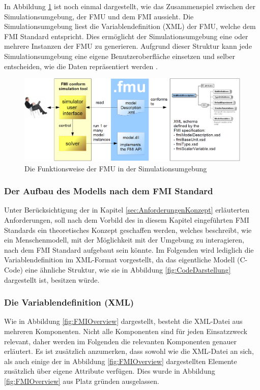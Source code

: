 \newline
In Abbildung \ref{fig:FMUEinordnung} ist noch einmal dargestellt, wie das Zusammenspiel zwischen der Simulationsumgebung, der FMU und dem FMI aussieht. Die Simulationsumgebung liest die Variablendefinition (XML) der FMU, welche dem FMI Standard entspricht. Dies ermöglicht der Simulationsumgebung eine oder mehrere Instanzen der FMU zu generieren. Aufgrund dieser Struktur kann jede Simulationsumgebung eine eigene Benutzeroberfläche einsetzen und selber entscheiden, wie die Daten repräsentiert werden \cite[S.7]{26}.
\begin{figure}[h]
	\centering
	\includegraphics[width=1\linewidth]{Bilder/A22_User-FMU-FMI}
	\caption{Die Funktionsweise der FMU in der Simulationsumgebung \cite[S.7]{26}}
	\label{fig:FMUEinordnung}
\end{figure}

\subsubsection{Der Aufbau des Modells nach dem FMI Standard}\label{sec:ModelAufbau}
Unter Berücksichtigung der in Kapitel \ref{sec:AnforderungenKonzept} erläuterten Anforderungen, soll nach dem Vorbild des in diesem Kapitel eingeführten FMI Standards ein theoretisches Konzept geschaffen werden, welches beschreibt, wie ein Menschenmodell, mit der Möglichkeit mit der Umgebung zu interagieren, nach dem FMI Standard aufgebaut sein könnte. Im Folgenden wird lediglich die Variablendefinition im XML-Format vorgestellt, da das eigentliche Modell (C-Code) eine ähnliche Struktur, wie sie in Abbildung \ref{fig:CodeDarstellung} dargestellt ist, besitzen würde.

\subsubsection{Die Variablendefinition (XML)}\label{sec:Variablendefinition}
\noindent Wie in Abbildung \ref{fig:FMIOverview} dargestellt, besteht die XML-Datei aus mehreren Komponenten. Nicht alle Komponenten sind für jeden Einsatzzweck relevant, daher werden im Folgenden die relevanten Komponenten genauer erläutert.
Es ist zusätzlich anzumerken, dass sowohl wie die XML-Datei an sich, als auch einige der in Abbildung \ref{fig:FMIOverview} dargestellten Elemente zusätzlich über eigene Attribute verfügen. Dies wurde in Abbildung \ref{fig:FMIOverview} aus Platz gründen ausgelassen.
